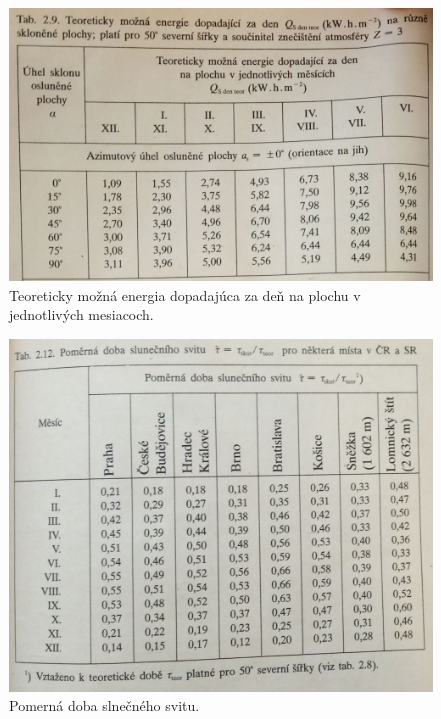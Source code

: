 \documentclass[a4paper, 11pt]{article}
\begin{document}
\begin{figure}[H] 
\centering
\includegraphics[width=.6\paperwidth]{images/str34.jpg}
\caption{Teoreticky možná energia dopadajúca za deň na plochu v jednotlivých mesiacoch.}
\label{str34}
\end{figure}

\begin{figure}[H] 
\centering
\includegraphics[width=.6\paperwidth]{images/str41.jpg}
\caption{Pomerná doba slnečného svitu.}
\label{str41}
\end{figure}
\end{document}
